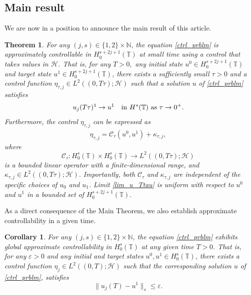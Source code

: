 \documentclass[10pt, reqno]{amsart}
\newtheorem{theorem}{Theorem}[section]
\numberwithin{equation}{section}
\newtheorem{corollary}{Corollary}[section]
\begin{document}
\subsection{Main result} 
We are now in a position to announce the main result of this article.
\begin{theorem}\label{main_thm}
	For any \( (j, s) \in \{1, 2\} \times \mathbb{N} \), the equation \eqref{ctrl_prblm} is approximately controllable in $H^{s+ 2j + 1}_0(\mathbb{T})$ at small time using a control that takes values in \( \mathcal{H} \). That is, for any $T > 0, $ any initial state \( u^0 \in H^{s+ 2j + 1}_0(\mathbb{T}) \) and target state \( u^1 \in H^{s+ 2j + 1}_0(\mathbb{T}) \), there exists a sufficiently small \( \tau > 0 \) and a control function \( \eta_{\tau, j} \in L^2((0, T\tau); \mathcal{H}) \) such that a solution \( u \) of \eqref{ctrl_prblm} satisfies  
	\begin{align}\label{lim_u_Ttau}  
		u_j(T \tau)\footnotemark \to u^1 \quad \text{in } H^s(\mathbb{T}) \text{ as } \tau \to 0^+.  
	\end{align}  
	Furthermore, the control \( \eta_{\tau, j} \) can be expressed as  
	\begin{align}\label{form_of_ctrl}  
		\eta_{\tau, j} = \mathcal{C}_{\tau}(u^0, u^1) + \kappa_{\tau, j},  
	\end{align}  
	where  
	\[
	\mathcal{C}_{\tau}: H^s_0(\mathbb{T}) \times H^s_0(\mathbb{T}) \to L^2((0, T\tau); \mathcal{H})  
	\]  
	is a bounded linear operator with a finite-dimensional range, and \( \kappa_{\tau, j} \in L^2((0, T\tau); \mathcal{H}) \). Importantly, both \( \mathcal{C}_{\tau} \) and \( \kappa_{\tau, j} \) are independent of the specific choices of \( u_0 \) and \( u_1 \). Limit \eqref{lim_u_Ttau} is uniform with respect to $u^0$ and $u^1$ in a bounded set of $H^{s+ 2j + 1}_0(\mathbb{T}).$
\end{theorem}
As a direct consequence of the Main Theorem, we also establish approximate controllability in a given time.
\begin{corollary}\label{Coro_to_cnclude_main_result}  
	For any \( (j, s) \in \{1, 2\} \times \mathbb{N} \), the equation \eqref{ctrl_prblm} exhibits global approximate controllability in \( H^s_0(\mathbb{T}) \) at any given time \( T > 0 \). That is, for any \( \varepsilon > 0 \) and any initial and target states \( u^0, u^1 \in H^s_0(\mathbb{T}) \), there exists a control function \( \eta_j \in L^2((0, T); \mathcal{H}) \) such that the corresponding solution \( u \) of \eqref{ctrl_prblm}, satisfies  
	\[
	\|u_j(T) - u^1 \|_{s} \leq \varepsilon.
	\]  
\end{corollary}
\end{document}

